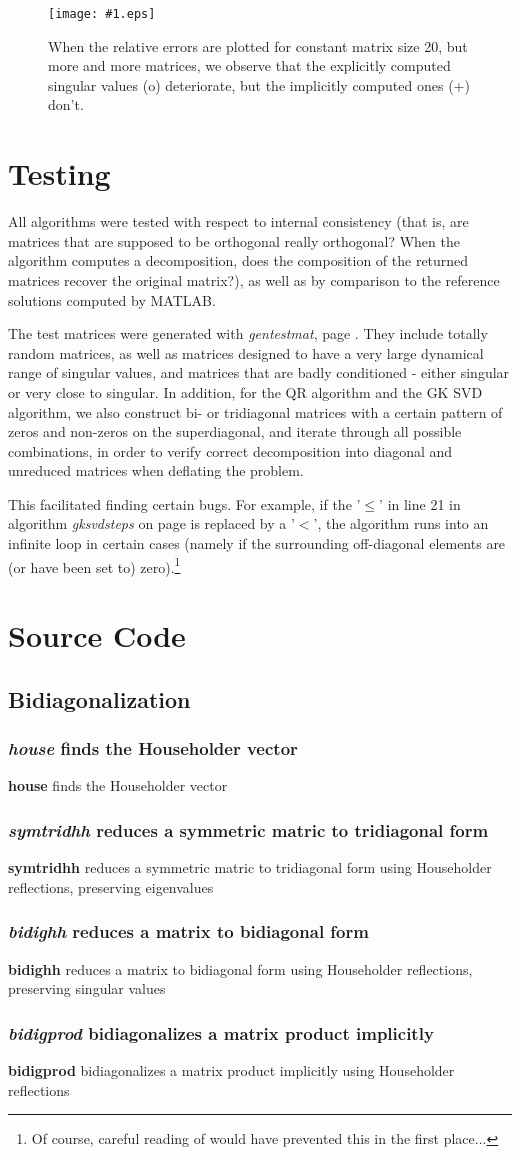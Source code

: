 \documentclass[11pt]{article}
\newcommand{\readcode}[3]
{
	\subsubsection{\emph{#1} #2}
	\textbf{#1} #2 #3}, label={rc:#1}]{#1.m}
}
\newcommand{\mypic}[2]
{
\begin{figure}[tbhp] 
       \centering
	\texttt{[image: \#1.eps]}
       \caption{\label{f:#1}#2}
 \end{figure} 
}
\begin{document}
\mypic{re2KKKN20}{When the relative errors are plotted for constant matrix size 20, but more and more matrices, we observe that the explicitly computed singular values (o) deteriorate, but the implicitly computed ones (+) don't.} 

\section{Testing}
All algorithms were tested with respect to internal consistency (that is, are matrices that are supposed to be orthogonal really orthogonal? When the algorithm computes a decomposition, does the composition of the returned matrices recover the original matrix?), as well as by comparison to the reference solutions computed by MATLAB. 

The test matrices were generated with \emph{gentestmat}, page \pageref{rc:gentestmat}. They include totally random matrices, as well as matrices designed to have a very large dynamical range of singular values, and matrices that are badly conditioned - either singular or very close to singular. In addition, for the QR algorithm and the GK SVD algorithm, we also construct bi- or tridiagonal matrices with a certain pattern of zeros and non-zeros on the superdiagonal, and iterate through all possible combinations, in order to verify correct decomposition into diagonal and unreduced matrices when deflating the problem.

This facilitated finding certain bugs. For example, if the '$\le$' in line 21 in algorithm \emph{gksvdsteps} on page \pageref{rc:gksvdsteps} is replaced by a '$<$', the algorithm runs into an infinite loop in certain cases (namely if the surrounding off-diagonal elements are (or have been set to) zero).\footnote{Of course, careful reading of \cite[page 455]{GolL96} would have prevented this in the first place...}

\appendix
\section{Source Code}

\subsection{Bidiagonalization}
\readcode{house}{finds the Householder vector}{}
\readcode{symtridhh}{reduces a symmetric matric to tridiagonal form}{using Householder reflections, preserving eigenvalues}
\readcode{bidighh}{reduces a matrix to bidiagonal form}{using Householder reflections, preserving singular values}
\readcode{bidigprod}{bidiagonalizes a matrix product implicitly}{using Householder reflections}
\end{document}
